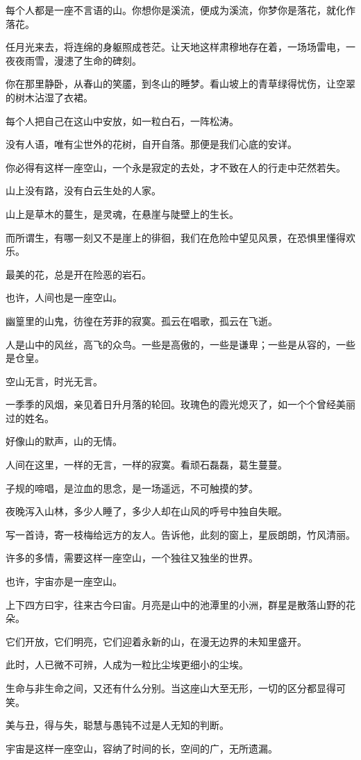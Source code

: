 		\vspace{1em}
		每个人都是一座不言语的山。你想你是溪流，便成为溪流，你梦你是落花，就化作落花。\par
		任月光来去，将连绵的身躯照成苍茫。让天地这样肃穆地存在着，一场场雷电，一夜夜雨雪，漫漶了生命的碑刻。\par
		你在那里静卧，从春山的笑靥，到冬山的睡梦。看山坡上的青草绿得忧伤，让空翠的树木沾湿了衣裙。\par
		每个人把自己在这山中安放，如一粒白石，一阵松涛。\par
		没有人语，唯有尘世外的花树，自开自落。那便是我们心底的安详。\par
		你必得有这样一座空山，一个永是寂定的去处，才不致在人的行走中茫然若失。\par
		山上没有路，没有白云生处的人家。\par
		山上是草木的蔓生，是灵魂，在悬崖与陡壁上的生长。\par
		而所谓生，有哪一刻又不是崖上的徘徊，我们在危险中望见风景，在恐惧里懂得欢乐。\par
		最美的花，总是开在险恶的岩石。

		\vspace{1em}
		也许，人间也是一座空山。\par
		幽篁里的山鬼，彷徨在芳菲的寂寞。孤云在唱歌，孤云在飞逝。\par
		人是山中的风丝，高飞的众鸟。一些是高傲的，一些是谦卑；一些是从容的，一些是仓皇。\par
		空山无言，时光无言。\par
		一季季的风烟，亲见着日升月落的轮回。玫瑰色的霞光熄灭了，如一个个曾经美丽过的姓名。\par
		好像山的默声，山的无情。\par
		人间在这里，一样的无言，一样的寂寞。看顽石磊磊，葛生蔓蔓。\par
		子规的啼唱，是泣血的思念，是一场遥远，不可触摸的梦。\par
		夜晚泻入山林，多少人睡了，多少人却在山风的呼号中独自失眠。\par
		写一首诗，寄一枝梅给远方的友人。告诉他，此刻的窗上，星辰朗朗，竹风清丽。\par
		许多的多情，需要这样一座空山，一个独往又独坐的世界。

		\vspace{1em}
		也许，宇宙亦是一座空山。\par
		上下四方曰宇，往来古今曰宙。月亮是山中的池潭里的小洲，群星是散落山野的花朵。\par
		它们开放，它们明亮，它们迎着永新的山，在漫无边界的未知里盛开。\par
		此时，人已微不可辨，人成为一粒比尘埃更细小的尘埃。\par
		生命与非生命之间，又还有什么分别。当这座山大至无形，一切的区分都显得可笑。\par
		美与丑，得与失，聪慧与愚钝不过是人无知的判断。\par
		宇宙是这样一座空山，容纳了时间的长，空间的广，无所遗漏。

